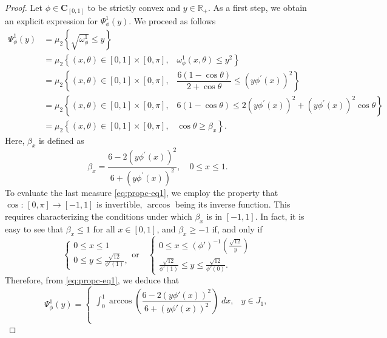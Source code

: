 \documentclass[11pt]{article}
\begin{document}
\begin{proof}
Let $\phi\in\mathbf{C}_{[0,1]}$ to be strictly convex and $y\in \mathbb{R}_+$. As a first step, we obtain an explicit expression for $\Psi_{\phi}^{1}(y)$. We proceed as follows
\begin{align}\label{eq:propc-eq1}
\Psi_{\phi}^{1}(y)&= \mu_2\left\{ \sqrt{\omega_{\phi}^1}\leq y\right\} \nonumber\\
& =\mu_2\left\{ (x,\theta)\in [0,1]\times[0,\pi],\;\;\; \omega_{\phi}^1(x,\theta)\leq y^2 \right\} \nonumber \\
 & =\mu_2\left\{ (x,\theta)\in [0,1]\times[0,\pi],\;\;\; \dfrac{6(1-\cos{\theta})}{2+\cos{\theta}}\leq \left(y \phi^{'}(x)\right)^2 \right\} \nonumber\\
 &= \mu_2\left\{ (x,\theta)\in [0,1]\times[0,\pi],\;\;\; 6(1-\cos{\theta})\leq 2 \left(y \phi^{'}(x)\right)^2 + \left(y \phi^{'}(x)\right)^2 \cos{\theta} \right\}\nonumber\\
 &= \mu_2\left\{ (x,\theta)\in [0,1]\times[0,\pi],\;\;\; \cos{\theta}\geq \beta_x \right\}.
\end{align}
Here, $\beta_x$ is defined as
$$
\beta_x = \dfrac{6-2 \left(y\phi^{'}(x)\right)^2}{6+\left(y \phi^{'}(x)\right)^2}, \quad 0 \leq x \leq 1. 
$$
To evaluate the last measure \eqref{eq:propc-eq1}, we employ the property that $\cos:\, [0, \pi] \longrightarrow [-1,1]$ is invertible, $\arccos$ being its inverse function. This requires characterizing the conditions under which $\beta_x$ is in $[-1, 1]$. In fact, it is easy to see that $\beta_x \leq 1$ for all $x \in [0,1]$, and $\beta_x \geq -1$ if, and only if
\begin{equation*}
    \left\{
\begin{array}{ll}
0 \leq x \leq 1 \\
0 \leq y \leq \frac{\sqrt{12}}{\phi'(1)}, 
 \end{array}
\right. \text{or} \quad \left\{
\begin{array}{ll}
0 \leq x \leq \left(\phi' \right)^{-1} \left( \frac{\sqrt{12}}{y} \right)\\
\frac{\sqrt{12}}{\phi'(1)} \leq y \leq \frac{\sqrt{12}}{\phi'(0)}.
\end{array}
\right.
\end{equation*}
Therefore, from \eqref{eq:propc-eq1}, we deduce that
\begin{equation}\label{psiequa}
  \Psi_{\phi}^{1}(y)=\left\{
\begin{array}{ll}
  \displaystyle\int_{0}^{1}\arccos\left(  \dfrac{6-2\left( y\phi'(x)\right)^2}{6+\left( y\phi'(x)\right)^2}\right)\;dx, &y\in J_1,\\\\


\end{array}
\end{equation}
\end{proof}
\end{document}
